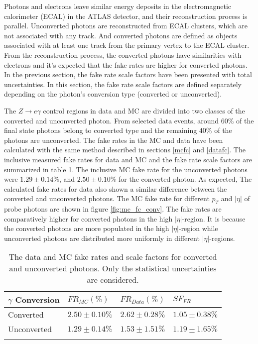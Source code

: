 Photons and electrons leave similar energy deposits in the electromagnetic calorimeter (ECAL) in the ATLAS detector, and their reconstruction process is parallel\cite{MITREVSKI20162539}. Unconverted photons are reconstructed from ECAL clusters, which are not associated with any track. And converted photons are defined as objects associated with at least one track from the primary vertex to the ECAL cluster. From the reconstruction process, the converted photons have similarities with electrons and it's expected that the fake rates are higher for converted photons. In the previous section, the fake rate scale factors have been presented with total uncertainties. In this section, the fake rate scale factors are defined separately depending on the photon's conversion type (converted or unconverted).

The $Z\rightarrow e\gamma$ control regions in data and MC are divided into two classes of the converted and unconverted photon. From selected data events, around $60\%$ of the final state photons belong to converted type and the remaining $40\%$ of the photons are unconverted.  The fake rates in the MC and data have been calculated with the same method described in sections \ref{mcfc} and \ref{datafc}. The inclusive measured fake rates for data and MC and the fake rate scale factors are summarized in table \ref{tab:conversion}. The inclusive MC fake rate for the unconverted photons were $1.29\pm0.14\%$, and $2.50\pm0.10\%$ for the converted photon. As expected, The calculated fake rates for data also shown a similar difference between the converted and unconverted photons. The MC fake rate for different $p_{T}$ and $|\eta|$ of probe photons are shown in figure \ref{fig:mc_fc_conv}. The fake rates are comparatively higher for converted photons in the high $|\eta|$-region. It is because the converted photons are more populated in the high $|\eta|$-region while unconverted photons are distributed more uniformly in different $|\eta|$-regions.

\begin{table}[H]
\caption{The data and MC fake rates and scale factors for converted and unconverted photons. Only the statistical uncertainties are considered.}
\label{tab:conversion}
\centering
\begin{tabular}{l l l l}
\toprule
$\gamma$ Conversion & $FR_{MC}(\%)$ & $FR_{Data}(\%)$ & $SF_{FR}$\\
\midrule
Converted & $2.50\pm0.10\%$ & $2.62\pm0.28\%$ & $1.05\pm0.38\%$ \\
Unconverted & $1.29\pm0.14\%$ & $1.53\pm1.51\%$ & $1.19\pm1.65\%$ \\
\bottomrule\\
\end{tabular}
\end{table}

